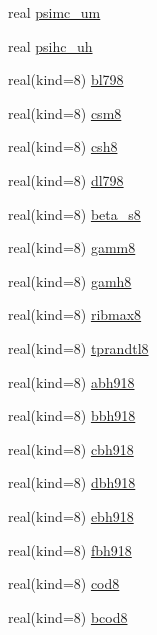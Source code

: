 \begin{DoxyCompactItemize}
\item 
real \hyperlink{namespacecanopy__air__coms_abf26fb907b070d554b4addfe5435bc83}{psimc\+\_\+um}
\item 
real \hyperlink{namespacecanopy__air__coms_a09727ee189e0154ebee372935fe46050}{psihc\+\_\+uh}
\item 
real(kind=8) \hyperlink{namespacecanopy__air__coms_a01333749038884ef7c92a4c7d8cd5624}{bl798}
\item 
real(kind=8) \hyperlink{namespacecanopy__air__coms_ad2e5b49ff61f88df7dc7407537e425ec}{csm8}
\item 
real(kind=8) \hyperlink{namespacecanopy__air__coms_ab97ef4e59d76536ebab6373c5172a42a}{csh8}
\item 
real(kind=8) \hyperlink{namespacecanopy__air__coms_a2189f77c04ada55938a8fa86ae2e646b}{dl798}
\item 
real(kind=8) \hyperlink{namespacecanopy__air__coms_ac5096fb457a6903675b8a7f074324c9b}{beta\+\_\+s8}
\item 
real(kind=8) \hyperlink{namespacecanopy__air__coms_ac396999ab6a5fba728faf7262e98e4a2}{gamm8}
\item 
real(kind=8) \hyperlink{namespacecanopy__air__coms_a613c632cb4cf3fc45475360ceb6209ed}{gamh8}
\item 
real(kind=8) \hyperlink{namespacecanopy__air__coms_a17599291264aab3f8153d5d83afe7d1f}{ribmax8}
\item 
real(kind=8) \hyperlink{namespacecanopy__air__coms_a16694a76d0a909ef9415fbcaee7b9742}{tprandtl8}
\item 
real(kind=8) \hyperlink{namespacecanopy__air__coms_a7bbc194838f911d2e8b0948159f4d62e}{abh918}
\item 
real(kind=8) \hyperlink{namespacecanopy__air__coms_a9c6504ecba9e79e8a45ab651e4f333ac}{bbh918}
\item 
real(kind=8) \hyperlink{namespacecanopy__air__coms_af33e7b269902b3016162017330ae0669}{cbh918}
\item 
real(kind=8) \hyperlink{namespacecanopy__air__coms_a63eef048a3bf4e6509c0f27b4fc0ca29}{dbh918}
\item 
real(kind=8) \hyperlink{namespacecanopy__air__coms_a11043a7112de7f9908ed6b300f294de9}{ebh918}
\item 
real(kind=8) \hyperlink{namespacecanopy__air__coms_a47de2ab0746525613b12c27bd8a16fda}{fbh918}
\item 
real(kind=8) \hyperlink{namespacecanopy__air__coms_a552c0a665b038439b55822a43a5c15e2}{cod8}
\item 
real(kind=8) \hyperlink{namespacecanopy__air__coms_a7b5193455d7f0ba7668b3b2f1988f468}{bcod8}

\end{DoxyCompactItemize}
